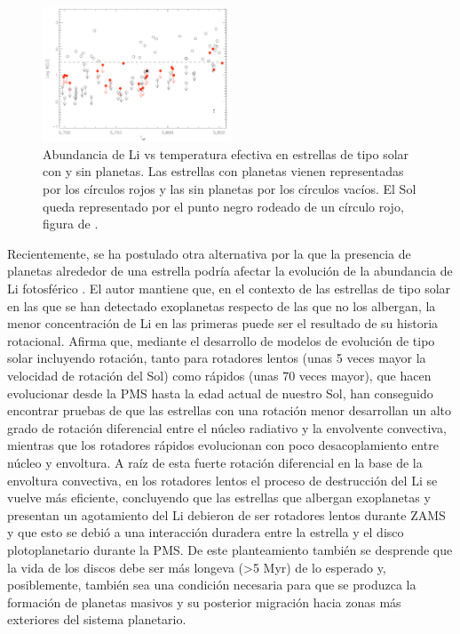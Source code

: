 \begin{figure}
	\centering
	\includegraphics[width=0.5\textwidth]{img/tesis/li_abundances_planets.pdf}
	\caption{Abundancia de Li vs temperatura efectiva en estrellas de tipo solar con y sin planetas. Las estrellas con planetas vienen representadas por los círculos rojos y las sin planetas por los círculos vacíos. El Sol queda representado por el punto negro rodeado de un círculo rojo, figura de \cite{Israelian2009}.}
	\label{fig:li_abundances_planets}
\end{figure}

Recientemente, se ha postulado otra alternativa por la que la presencia de planetas alrededor de una estrella podría afectar la evolución de la abundancia de Li fotosférico \cite{Bouvier2008}. El autor mantiene que, en el contexto de las estrellas de tipo solar en las que se han detectado exoplanetas respecto de las que no los albergan, la menor concentración de Li en las primeras puede ser el resultado de su historia rotacional. Afirma que, mediante el desarrollo de modelos de evolución de tipo solar incluyendo rotación, tanto para rotadores lentos (unas 5 veces mayor la velocidad de rotación del Sol) como rápidos (unas 70 veces mayor), que hacen evolucionar desde la PMS hasta la edad actual de nuestro Sol, han conseguido encontrar pruebas de que las estrellas con una rotación menor desarrollan un alto grado de rotación diferencial entre el núcleo radiativo y la envolvente convectiva, mientras que los rotadores rápidos evolucionan con poco desacoplamiento entre núcleo y envoltura. A raíz de esta fuerte rotación diferencial en la base de la envoltura convectiva, en los rotadores lentos el proceso de destrucción del Li se vuelve más eficiente, concluyendo que las estrellas que albergan exoplanetas y presentan un agotamiento del Li debieron de ser rotadores lentos durante ZAMS y que esto se debió a una interacción duradera entre la estrella y el disco plotoplanetario durante la PMS. De este planteamiento también se desprende que la vida de los discos debe ser más longeva (>5 Myr) de lo esperado y, posiblemente, también sea una condición necesaria para que se produzca la formación de planetas masivos y su posterior migración hacia zonas más exteriores del sistema planetario.\par

